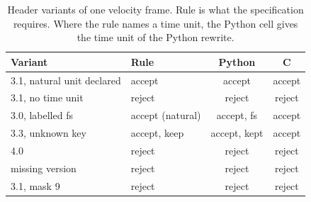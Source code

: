 \begin{table}[tbp]
\centering
\small
\caption{Header variants of one velocity frame.
Rule is what the specification requires.
Where the rule names a time unit, the Python cell gives the time unit of the Python rewrite.}
\label{tab:versionsafety}
\footnotesize
\setlength{\tabcolsep}{3pt}
\begin{tabular}{@{}llcc@{}}
\toprule
Variant & Rule & Python & C \\
\midrule
3.1, natural unit declared & accept & accept & accept \\
3.1, no time unit & reject & reject & reject \\
3.0, labelled fs & accept (natural) & accept, fs & accept \\
3.3, unknown key & accept, keep & accept, kept & accept \\
4.0 & reject & reject & reject \\
missing version & reject & reject & reject \\
3.1, mask 9 & reject & reject & reject \\
\bottomrule
\end{tabular}
\end{table}
